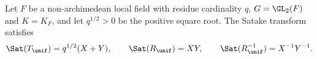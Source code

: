 Let $F$ be a non-archimedean local field with residue cardinality $q$, $G=\GL_2(F)$ and $K=K_F$, and let
$q^{1/2}>0$ be the positive square root. The Satake transform satisfies
\[
  \Sat(T_\unif)=q^{1/2}(X+Y),\qquad\Sat(R_\unif)=XY,\qquad\Sat(R_\unif^{-1})=X^{-1}Y^{-1}.
\]
